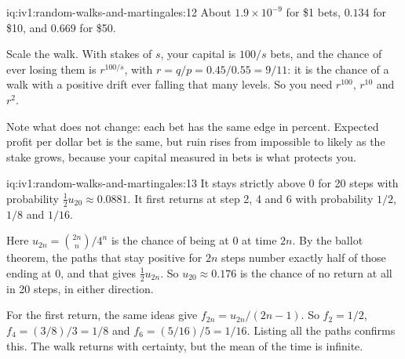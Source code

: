 \begin{solution}{iq:iv1:random-walks-and-martingales:12}
About $1.9 \times 10^{-9}$ for \$1 bets, $0.134$ for \$10, and $0.669$ for \$50.

Scale the walk. With stakes of $s$, your capital is $100/s$ bets, and the chance of ever losing them is $r^{100/s}$, with $r = q/p = 0.45/0.55 = 9/11$: it is the chance of a walk with a positive drift ever falling that many levels. So you need $r^{100}$, $r^{10}$ and $r^2$.

Note what does not change: each bet has the same edge in percent. Expected profit per dollar bet is the same, but ruin rises from impossible to likely as the stake grows, because your capital measured in bets is what protects you.

\end{solution}

\begin{solution}{iq:iv1:random-walks-and-martingales:13}
It stays strictly above 0 for 20 steps with probability $\tfrac12 u_{20} \approx 0.0881$. It first returns at step 2, 4 and 6 with probability $1/2$, $1/8$ and $1/16$.

Here $u_{2n} = \binom{2n}{n}/4^n$ is the chance of being at 0 at time $2n$. By the ballot theorem, the paths that stay positive for $2n$ steps number exactly half of those ending at 0, and that gives $\tfrac12 u_{2n}$. So $u_{20} \approx 0.176$ is the chance of no return at all in 20 steps, in either direction.

For the first return, the same ideas give $f_{2n} = u_{2n}/(2n - 1)$. So $f_2 = 1/2$, $f_4 = (3/8)/3 = 1/8$ and $f_6 = (5/16)/5 = 1/16$. Listing all the paths confirms this. The walk returns with certainty, but the mean of the time is infinite.

\end{solution}

